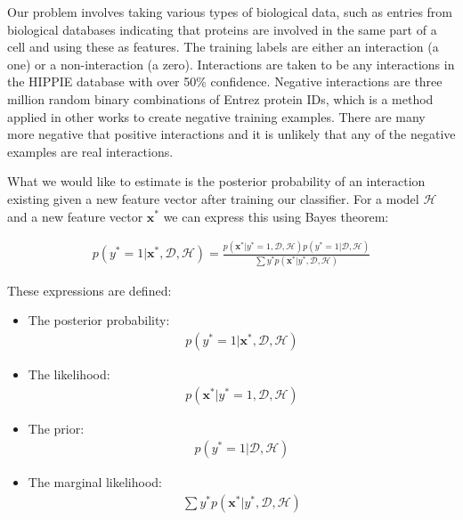 Our problem involves taking various types of biological data, such as entries from biological databases indicating that proteins are involved in the same part of a cell and using these as features.
The training labels are either an interaction (a one) or a non-interaction (a zero).
Interactions are taken to be any interactions in the HIPPIE\autocite{schaefer_hippie:_2012} database with over 50\% confidence.
Negative interactions are three million random binary combinations of Entrez protein IDs, which is a method applied in other works\autocite{qi_evaluation_2006} to create negative training examples.
There are many more negative that positive interactions and it is unlikely that any of the negative examples are real interactions.

What we would like to estimate is the posterior probability of an interaction existing given a new feature vector after training our classifier.
For a model $\mathcal{H}$ and a new feature vector $\pmb{x}^{*}$ we can express this using Bayes theorem:

\begin{align}
    p(y^{*} = 1 | \pmb{x}^{*}, \mathcal{D}, \mathcal{H}) = \frac{ p(\pmb{x}^{*}| y^{*} = 1 , \mathcal{D}, \mathcal{H}) p( y^{*} = 1 | \mathcal{D}, \mathcal{H})}{ \sum{y^{*}} p( \pmb{x}^{*} | y^{*}, \mathcal{D}, \mathcal{H})}
\end{align}

These expressions are defined:

\begin{itemize}
    \item The posterior probability:
        \begin{align}
            p(y^{*} = 1 | \pmb{x}^{*}, \mathcal{D}, \mathcal{H})
        \end{align}
    \item The likelihood:
        \begin{align}
            p(\pmb{x}^{*}| y^{*} = 1 , \mathcal{D}, \mathcal{H})
        \end{align}
    \item The prior:
        \begin{align}
            p( y^{*} = 1 | \mathcal{D}, \mathcal{H})
        \end{align}
    \item The marginal likelihood:
        \begin{align}
            \sum{y^{*}} p( \pmb{x}^{*} | y^{*}, \mathcal{D}, \mathcal{H})
        \end{align}
\end{itemize}

